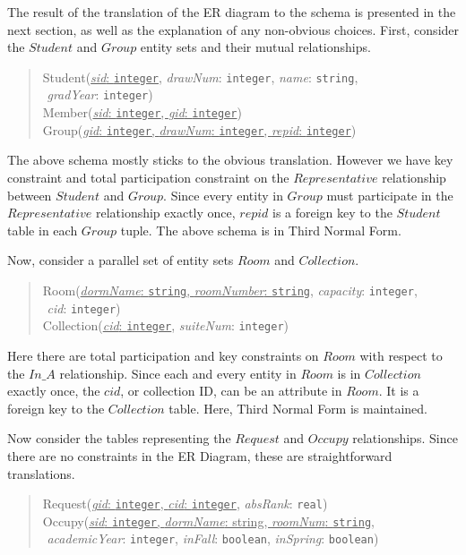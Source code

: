 \documentclass{article}
\begin{document}
The result of the translation of the ER diagram to the schema is presented in the next section, as well as the explanation of any non-obvious choices. First, consider the $Student$ and $Group$ entity sets and their mutual relationships.

\begin{quote}
  \noindent Student(\underline{\textit{sid}: \texttt{integer}}, \textit{drawNum}: \texttt{integer}, \textit{name}: \texttt{string}, \\ $\mbox{}$ \qquad \quad  \textit{gradYear}: \texttt{integer}) \\
  \noindent Member(\underline{\textit{sid}: \texttt{integer}, \textit{gid}: \texttt{integer}}) \\
  \noindent Group(\underline{\textit{gid}: \texttt{integer}, \textit{drawNum}: \texttt{integer}, \textit{repid}: \texttt{integer}})\\
\end{quote}

The above schema mostly sticks to the obvious translation.  However we have key constraint and total participation constraint on the $Representative$ relationship between $Student$ and $Group$. Since every entity in $Group$ must participate in the $Representative$ relationship exactly once, $repid$ is a foreign key to the $Student$ table in each $Group$ tuple. The above schema is in Third Normal Form.

Now, consider a parallel set of entity sets $Room$ and $Collection$.

\begin{quote}
  \noindent Room(\underline{\textit{dormName}: \texttt{string}, \textit{roomNumber}: \texttt{string}}, \textit{capacity}: \texttt{integer}, \\ $\mbox{}$ \qquad \quad \textit{cid}: \texttt{integer}) \\
  \noindent Collection(\underline{\textit{cid}: \texttt{integer}}, \textit{suiteNum}: \texttt{integer})\\
\end{quote}

Here there are total participation and key constraints on $Room$ with respect to the $In\_A$ relationship.  Since each and every entity in $Room$ is in $Collection$ exactly once, the $cid$, or collection ID, can be an attribute in $Room$. It is a foreign key to the $Collection$ table. Here, Third Normal Form is maintained.

Now consider the tables representing the $Request$ and $Occupy$ relationships. Since there are no constraints in the ER Diagram, these are straightforward translations.
\begin{quote}
  \noindent Request(\underline{\textit{gid}: \texttt{integer}, \textit{cid}: \texttt{integer}}, \textit{absRank}: \texttt{real}) \\
  \noindent Occupy(\underline{\textit{sid}: \texttt{integer}, \textit{dormName}: string, \textit{roomNum}: \texttt{string}}, \\ $\mbox{}$ \qquad \quad \textit{academicYear}: \texttt{integer}, \textit{inFall}: \texttt{boolean}, \textit{inSpring}: \texttt{boolean}) \\
\end{quote}
\end{document}
